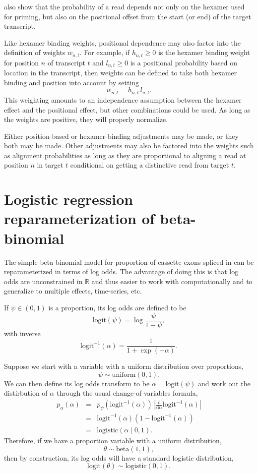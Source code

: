 \documentclass[11pt]{report}
\newcommand{\logit}{\textrm{logit}}
\newcommand{\ilogit}{\logit^{-1}}
\newcommand{\deriv}[1]{\frac{\textrm{d}}{\textrm{d}#1}}
\begin{document}
\cite{roberts2011improving} also show that the probability of a read
depends not only on the hexamer used for priming, but also on the
positional offset from the start (or end) of the target transcript.

Like hexamer binding weights, positional dependence may also factor
into the definition of weights $w_{n, t}$.  For example, if
$h_{n, t} \geq 0$ is the hexamer binding weight for position $n$ of
transcript $t$ and $l_{n, t} \geq 0$ is a positional probability based
on location in the transcript, then weights can be defined to take
both hexamer binding and position into account by setting
\[
  w_{n, t} = h_{n, t} \, l_{n, t}.
\]
This weighting amounts to an independence assumption between the
hexamer effect and the positional effect, but other combinations could
be used.  As long as the weights are positive, they will properly
normalize.

Either position-based or hexamer-binding adjustments may be made, or
they both may be made.  Other adjustments may also be factored into
the weights such as alignment probabilities as long as they are
proportional to aligning a read at position $n$ in target $t$
conditional on getting a distinctive read from target $t$.


\section{Logistic regression reparameterization of beta-binomial}

The simple beta-binomial model for proportion of cassette exons
spliced in can be reparameterized in terms of log odds.  The advantage
of doing this is that log odds are unconstrained in $\mathbb{R}$ and
thus easier to work with computationally and to generalize to multiple
effects, time-series, etc.

If $\psi \in (0, 1)$ is a proportion, its log odds are defined to be
\[
  \logit(\psi) = \log \frac{\psi}{1 - \psi},
\]
with inverse
\[
  \ilogit(\alpha) = \frac{1}{1 + \exp(-\alpha)}.
\]

Suppose we start with a variable with a uniform distribution over
proportions,
\[
  \psi \sim \textrm{uniform}(0, 1).
\]
We can then define its log odds transform to be $\alpha =
\logit(\psi)$ and work out the distirbution of $\alpha$ through the
usual change-of-variables formula,
%
\begin{eqnarray*}
  p_{\alpha}(\alpha)
  & = & p_{\psi}(\ilogit(\alpha))
        \, \left| \deriv{\alpha} \ilogit(\alpha) \right|
  \\[4pt]
  & = & \ilogit(\alpha) (1 - \ilogit(\alpha))
  \\[4pt]
  & = & \textrm{logistic}(\alpha \mid 0, 1).
\end{eqnarray*}
%
Therefore, if we have a proportion variable with a uniform
distribution,
\[
  \theta \sim \textrm{beta}(1, 1),
\]
then by construction, its log odds will have a standard logistic
distribution,
\[
  \logit(\theta) \sim \textrm{logistic}(0, 1).
\]
\end{document}
